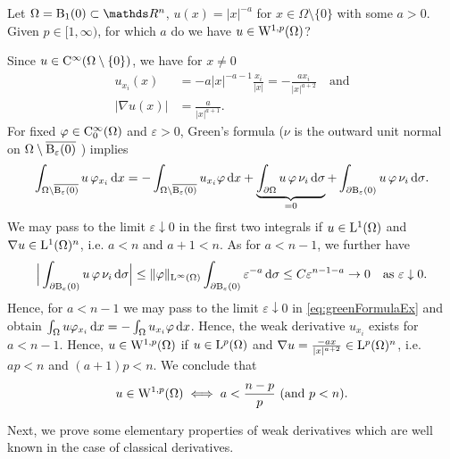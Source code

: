 \begin{ex}
  Let $\Omega = \BB_1(0) \subset \R^n$, $u(x) = |x|^{-a}$ for $x \in \Omega \setminus \{0\}$ with some $a > 0$.
  Given $p \in [1,\infty)$, for which $a$ do we have $u \in \mathrm{W}^{1,p}(\Omega)$?

    Since $u \in \mathrm{C}^\infty(\Omega \setminus \{0\})$, we have for $x \neq 0$
    \begin{align*}
      u_{x_i}(x) &= -a|x|^{-a-1} \frac{x_i}{|x|} = -\frac{ax_i}{|x|^{a + 2}} \quad \text{and} \\
      |\nabla u(x)| &= \frac{a}{|x|^{a + 1}}.
    \end{align*}
    For fixed $\varphi \in \mathrm{C}_0^\infty(\Omega)$ and $\varepsilon > 0$, Green's formula ($\nu$ is the outward unit normal on $\Omega \setminus \overline{\mathrm{B}_\varepsilon(0)}$ ) implies
    \begin{equation}
      \label{eq:greenFormulaEx}
      \int_{\Omega \setminus \overline{\mathrm{B}_\varepsilon(0)}} u \, \varphi_{x_i} \, {\operatorname{d}\!{x}}
      = -\int_{\Omega \setminus \overline{\mathrm{B}_\varepsilon(0)}} u_{x_i} \varphi \, {\operatorname{d}\!{x}} + \underbrace{\int_{\partial \Omega} u \, \varphi \, \nu_i \, {\operatorname{d}\!{\sigma}}}_{= 0}
      + \int_{\partial \mathrm{B}_\varepsilon(0)} u \, \varphi \, \nu_i \, {\operatorname{d}\!{\sigma}}.
    \end{equation}
    We may pass to the limit $\varepsilon \downarrow 0$ in the first two integrals if $u \in \mathrm{L}^1(\Omega)$ and $\nabla u \in \mathrm{L}^1(\Omega)^n$, i.e. $a < n$ and $a + 1 < n$.
    As for $a < n - 1$, we further have
    $$
    \Big| \int_{\partial \mathrm{B}_\varepsilon(0)} u \, \varphi \,  \nu_i \, {\operatorname{d}\!{\sigma}} \Big|
      \leq \|\varphi\|_{\mathrm{L}^\infty(\Omega)} \int_{\partial \mathrm{B}_\varepsilon(0)} \varepsilon^{-a} \, {\operatorname{d}\!{\sigma}}
      \leq C \varepsilon^{n - 1 - a} \to 0 \quad\text{as } \varepsilon \downarrow 0.
    $$
    Hence, for $a < n - 1$ we may pass to the limit $\varepsilon \downarrow 0$ in \eqref{eq:greenFormulaEx} and obtain $\int_\Omega u\varphi_{x_i} \, {\operatorname{d}\!{x}} = - \int_\Omega u_{x_i} \varphi \, {\operatorname{d}\!{x}}$.
    Hence, the weak derivative $u_{x_i}$ exists for $a < n - 1$.
    Hence, $u \in \mathrm{W}^{1,p}(\Omega)$ if $u \in \mathrm{L}^p(\Omega)$ and $\nabla u = \frac{-a x}{|x|^{a + 2}} \in \mathrm{L}^p(\Omega)^n$, i.e. $ap < n$ and $(a + 1)p < n$.
    We conclude that
    $$
    u \in \mathrm{W}^{1,p}(\Omega) \iff a < \frac{n - p}{p} \text{ (and $p < n$)}.
    $$
\end{ex}

Next, we prove some elementary properties of weak derivatives which are well known in the case of classical derivatives.

